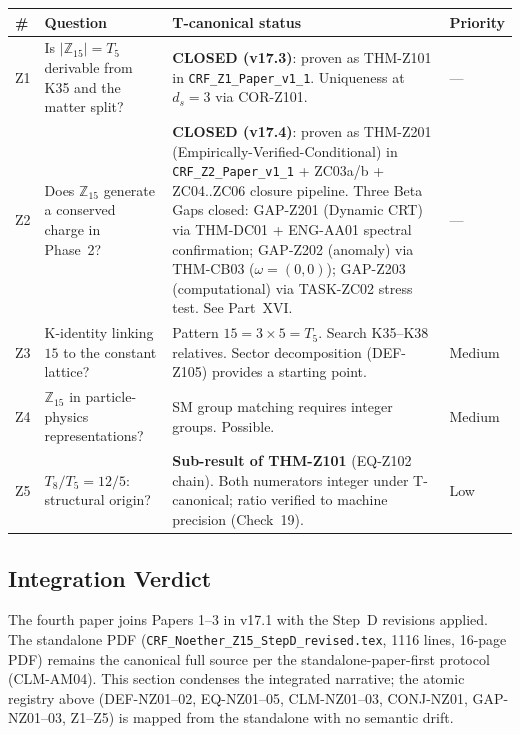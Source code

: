 \documentclass[12pt, a4paper]{article}
\begin{document}
\begin{center}
\renewcommand{\arraystretch}{1.30}
{\small
\begin{tabular}{p{0.7cm} p{6.0cm} p{4.5cm} p{1.4cm}}
\toprule
\textbf{\#} & \textbf{Question} & \textbf{T-canonical status}
            & \textbf{Priority} \\
\midrule
Z1 & Is $|\mathbb{Z}_{15}| = T_5$ derivable from K35 and the matter split?
   & \textbf{CLOSED (v17.3)}: proven as THM-Z101 in \texttt{CRF\_Z1\_Paper\_v1\_1}. Uniqueness at $d_s = 3$ via COR-Z101.
   & --- \\
Z2 & Does $\mathbb{Z}_{15}$ generate a conserved charge in Phase~2?
   & \textbf{CLOSED (v17.4)}: proven as THM-Z201 (Empirically-Verified-Conditional) in \texttt{CRF\_Z2\_Paper\_v1\_1} + ZC03a/b + ZC04..ZC06 closure pipeline. Three Beta Gaps closed: GAP-Z201 (Dynamic CRT) via THM-DC01 + ENG-AA01 spectral confirmation; GAP-Z202 (anomaly) via THM-CB03 ($\omega = (0,0)$); GAP-Z203 (computational) via TASK-ZC02 stress test. See Part~XVI.
   & --- \\
Z3 & K-identity linking $15$ to the constant lattice?
   & Pattern $15 = 3 \times 5 = T_5$. Search K35--K38 relatives. Sector decomposition (DEF-Z105) provides a starting point.
   & Medium \\
Z4 & $\mathbb{Z}_{15}$ in particle-physics representations?
   & SM group matching requires integer groups. Possible.
   & Medium \\
Z5 & $T_8/T_5 = 12/5$: structural origin?
   & \textbf{Sub-result of THM-Z101} (EQ-Z102 chain). Both numerators integer under T-canonical; ratio verified to machine precision (Check~19).
   & Low \\
\bottomrule
\end{tabular}
}
\end{center}

\subsection{Integration Verdict}

The fourth paper joins Papers 1--3 in v17.1 with the Step~D
revisions applied. The standalone PDF
(\texttt{CRF\_Noether\_Z15\_StepD\_revised.tex}, 1116 lines,
16-page PDF) remains the canonical full source per the
standalone-paper-first protocol (CLM-AM04). This section condenses
the integrated narrative; the atomic registry above
(DEF-NZ01--02, EQ-NZ01--05, CLM-NZ01--03, CONJ-NZ01,
GAP-NZ01--03, Z1--Z5) is mapped from the standalone with no semantic
drift.
\end{document}
